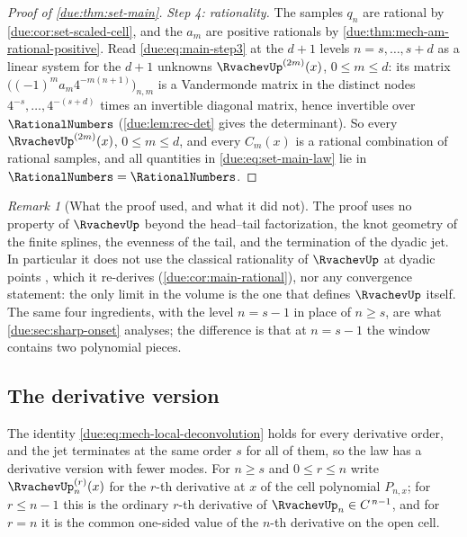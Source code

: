 \documentclass[11pt,oneside]{article}
\theoremstyle{plain}
\theoremstyle{definition}
\theoremstyle{remark}
\newtheorem{remark}[theorem]{Remark}
\newcommand{\Kk}{\RationalNumbers}                          %
\newcommand{\upn}[1]{\RvachevUp_{#1}}
\newcommand{\am}[1]{a_{#1}}                                 %
\newcommand{\Cr}[2]{C_{#1}\!\left(#2\right)}                %
\newcommand{\qn}[1]{q_{#1}}                                 %
\begin{document}
\begin{proof}[Proof of \cref{due:thm:set-main}]
\emph{Step 4: rationality.}
The samples $\qn{n}$ are rational by \cref{due:cor:set-scaled-cell}, and
the $\am{m}$ are positive rationals by
\cref{due:thm:mech-am-rational-positive}.  Read \cref{due:eq:main-step3} at
the $d+1$ levels $n=s,\ldots,s+d$ as a linear system for the $d+1$ unknowns
$\RvachevUp^{(2m)}(x)$, $0\le m\le d$: its matrix
$\bigl((-1)^{m}\am{m}4^{-m(n+1)}\bigr)_{n,m}$ is a Vandermonde matrix in
the distinct nodes $4^{-s},\ldots,4^{-(s+d)}$ times an invertible diagonal
matrix, hence invertible over $\RationalNumbers$
(\cref{due:lem:rec-det} gives the determinant).  So every
$\RvachevUp^{(2m)}(x)$, $0\le m\le d$, and every $\Cr{m}{x}$ is a rational
combination of rational samples, and all quantities in
\cref{due:eq:set-main-law} lie in $\Kk=\RationalNumbers$.
\end{proof}

\begin{remark}[What the proof used, and what it did not]
\label{due:rmk:main-ingredients}
The proof uses no property of $\RvachevUp$ beyond the head--tail
factorization, the knot geometry of the finite splines, the evenness of the
tail, and the termination of the dyadic jet.  In particular it does not use
the classical rationality of $\RvachevUp$ at dyadic points
\cite{arias1982,arias2018}, which it re-derives (\cref{due:cor:main-rational}),
nor any convergence statement: the only limit in the volume is the one that
defines $\RvachevUp$ itself.  The same four ingredients, with the level
$n=s-1$ in place of $n\ge s$, are what \cref{due:sec:sharp-onset} analyses;
the difference is that at $n=s-1$ the window contains two polynomial pieces.
\end{remark}

\subsection{The derivative version}
\label{due:sec:main-derivative}

The identity \cref{due:eq:mech-local-deconvolution} holds for every
derivative order, and the jet terminates at the same order $s$ for all of
them, so the law has a derivative version with fewer modes.  For $n\ge s$
and $0\le r\le n$ write $\upn{n}^{(r)}(x)$ for the $r$-th derivative at $x$
of the cell polynomial $P_{n,x}$; for $r\le n-1$ this is the ordinary
$r$-th derivative of $\upn{n}\in C^{\,n-1}$, and for $r=n$ it is the
common one-sided value of the $n$-th derivative on the open cell.
\end{document}
